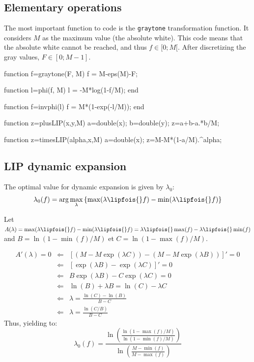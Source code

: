 \def\QRCODE{MASTER_mispa_TUT.IMG.lip_matlabqrcode.png}
\def\QRPAGE{http://www.iptutorials.science/tree/master/MASTER_mispa/TUT.IMG.lip/matlab}
\subsection{Elementary operations}
The most important function to code is the \lstinline!graytone! transformation function. It considers $M$ as the maximum value (the absolute white). This code means that the absolute white cannot be reached, and thus $f\in[0;M[$. After discretizing the gray values, $F\in[0;M-1]$.

\begin{matlab}
function f=graytone(F, M)
f = M-eps(M)-F;
\end{matlab}

\begin{matlab}
function l=phi(f, M)
l = -M*log(1-f/M);
end

function f=invphi(l)
f = M*(1-exp(-l/M));
end
\end{matlab}


\begin{matlab}
function z=plusLIP(x,y,M)
a=double(x);
b=double(y);
z=a+b-a.*b/M;
\end{matlab}

\begin{matlab}
function z=timesLIP(alpha,x,M)
a=double(x);
z=M-M*(1-a/M).^alpha;
\end{matlab}

\subsection{LIP dynamic expansion}
The optimal value for dynamic expansion is given by $\lambda_0$:
$$\lambda_0(f)=\arg\max_{\lambda}\left\{\max(\lambda\lipfois{} f)-\min(\lambda\lipfois{} f) \right\}$$

Let $A(\lambda)=\max(\lambda\lipfois{} f)-\min(\lambda\lipfois{} f)=\lambda\lipfois{}\max(f)-\lambda\lipfois{}\min(f)$ and $B=\ln(1-\min(f)/M)$ et $C=\ln(1-\max(f)/M)$.


\begin{eqnarray*}
A'(\lambda)=0&\Leftarrow &[(M-M\exp(\lambda C))-(M-M\exp(\lambda B))]'=0\\
&\Leftarrow & [\exp(\lambda B)-\exp(\lambda C)]'=0\\
&\Leftarrow & B\exp(\lambda B)-C\exp(\lambda C)=0\\
&\Leftarrow & \ln(B)+\lambda B=\ln(C) -\lambda C\\
&\Leftarrow & \lambda=\frac{\ln(C)-\ln(B)}{B-C}\\
&\Leftarrow & \lambda=\frac{\ln(C/B)}{B-C}
\end{eqnarray*}
Thus, yielding to:
$$\lambda_0(f)=\frac{\displaystyle\ln\left(\frac{\ln(1-\max(f)/M)}{\ln(1-\min(f)/M)}\right)}{\displaystyle\ln\left(\frac{M-\min(f)}{M-\max(f)}\right)}$$

